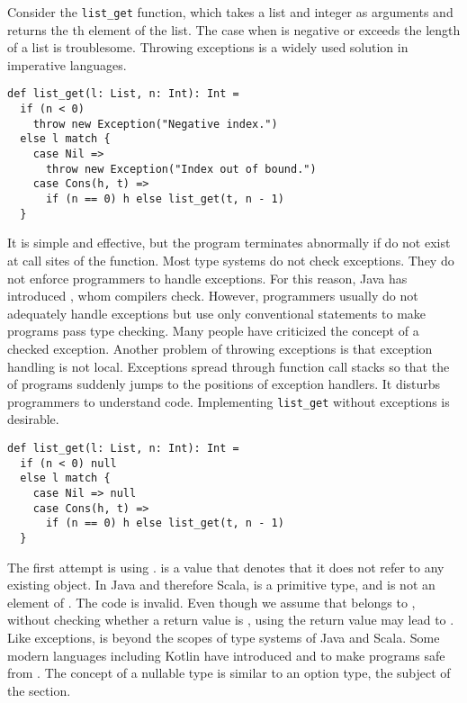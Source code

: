 Consider the \verb!list_get! function, which takes a list and integer  as
arguments and returns the th element of the list. The case when 
is negative or exceeds the length of a list is troublesome. Throwing exceptions
is a widely used solution in imperative languages.

\begin{verbatim}
def list_get(l: List, n: Int): Int =
  if (n < 0)
    throw new Exception("Negative index.")
  else l match {
    case Nil =>
      throw new Exception("Index out of bound.")
    case Cons(h, t) =>
      if (n == 0) h else list_get(t, n - 1)
  }
\end{verbatim}

It is simple and effective, but the program terminates abnormally if
 do not exist at call sites of the function. Most type
systems do not check exceptions. They do not enforce programmers to handle
exceptions. For this reason, Java has introduced , whom
compilers check. However, programmers usually do not adequately handle exceptions
but use only conventional  statements to make programs pass type
checking. Many people have criticized the concept of a checked exception. Another
problem of throwing exceptions is that exception handling is not local.
Exceptions spread through function call stacks so that the  of
programs suddenly jumps to the positions of exception handlers. It disturbs
programmers to understand code. Implementing \verb!list_get! without exceptions
is desirable.

\begin{verbatim}
def list_get(l: List, n: Int): Int =
  if (n < 0) null
  else l match {
    case Nil => null
    case Cons(h, t) =>
      if (n == 0) h else list_get(t, n - 1)
  }
\end{verbatim}

The first attempt is using .  is a value that denotes that
it does not refer to any existing object. In Java and therefore Scala, 
is a primitive type, and  is not an element of . The code is
invalid. Even though we assume that  belongs to , without
checking whether a return value is , using the return value may lead
to . Like exceptions,  is beyond the scopes
of type systems of Java and Scala. Some modern languages including Kotlin have
introduced  and  to make programs safe
from . The concept of a nullable type is similar to an
option type, the subject of the section.


